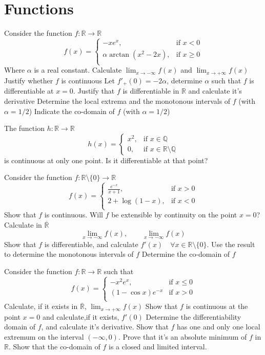 \documentclass[12pt]{article}
\begin{document}
\section{Functions}
\begin{ExerciseList}
	\Exercise Consider the function $f\colon \mathbb R \to \mathbb R$
	$$f(x) = \begin{cases} -x e^x, & \mbox{if $x<0$} \\ \alpha\arctan(x^2-2x), &\mbox{if $x\ge 0$} \\ \end{cases}$$
	Where $\alpha$ is a real constant.
	\Question Calculate $\lim_{x\to -\infty}f(x)$ and $\lim_{x\to +\infty}f(x)$
	\Question Justify whether $f$ is continuous
	\Question Let $f'_+(0)=-2\alpha$, determine $\alpha$ such that $f$ is differentiable at $x=0$. Justify that $f$ is differentiable in $\mathbb R$ and calculate it's derivative
	\Question Determine the local extrema and the monotonous intervals of $f$ (with $\alpha = 1/2$)
	\Question Indicate the co-domain of $f$ (with $\alpha=1/2$)

	\Exercise The function $h\colon \mathbb R \to \mathbb R$
	$$h(x)=\begin{cases}x^2, & \mbox{if $x\in\mathbb Q$} \\ 0, & \mbox{if $x\in\mathbb R\setminus\mathbb Q$}\end{cases}$$
	is continuous at only one point. Is it differentiable at that point?

	\Exercise Consider the function $f\colon \mathbb R\setminus\{0\}\to\mathbb R$
	$$f(x) = \begin{cases} \frac{e^{-x}}{x+1}, & \mbox{if $x>0$} \\ 2+\log(1-x), & \mbox{if $x<0$} \\ \end{cases}$$
	\Question Show that $f$ is continuous. Will $f$ be extensible by continuity on the point $x=0$?
	\Question Calculate in $\overline{\mathbb R}$
	$$\lim_{x\to -\infty}f(x), \qquad \lim_{x\to -\infty}f(x)$$
	\Question Show that $f$ is differentiable, and calculate $f'(x)\quad\forall x\in\mathbb R\setminus \{ 0\}$.
	Use the result to determine the monotonous intervals of $f$
	\Question Determine the co-domain of $f$

	\Exercise Consider the function $f\colon \mathbb R\to \mathbb R$ such that
	$$f(x)=\begin{cases}-x^2e^x, & \mbox{if $x\le 0$} \\ (1-\cos x)e^{-x} & \mbox{if $x>0$} \\ \end{cases}$$
	\Question Calculate, if it exists in $\overline{\mathbb R}$, $\lim_{x\to +\infty}f(x)$
	\Question Show that $f$ is continuous at the point $x=0$ and calculate,if it exists, $f'(0)$
	\Question Determine the differentiability domain of $f$, and calculate it's derivative.
	\Question Show that $f$ has one and only one local extremum on the interval $(-\infty, 0)$.
	Prove that it's an absolute minimum of $f$ in $\mathbb R$.
	\Question Show that the co-domain of $f$ is a closed and limited interval.


\end{ExerciseList}
\end{document}
